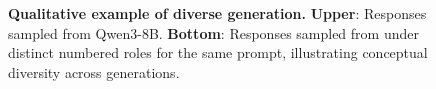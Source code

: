 \begin{figure}[t]
\vspace{6pt}
\caption{\textbf{Qualitative example of diverse generation.} \textbf{Upper}: Responses sampled from Qwen3-8B. \textbf{Bottom}: Responses sampled from \method{} under distinct numbered roles for the same prompt, illustrating conceptual diversity across generations.}

\label{fig:qualitative-example-books}
\vspace{-0.4cm}
\end{figure}